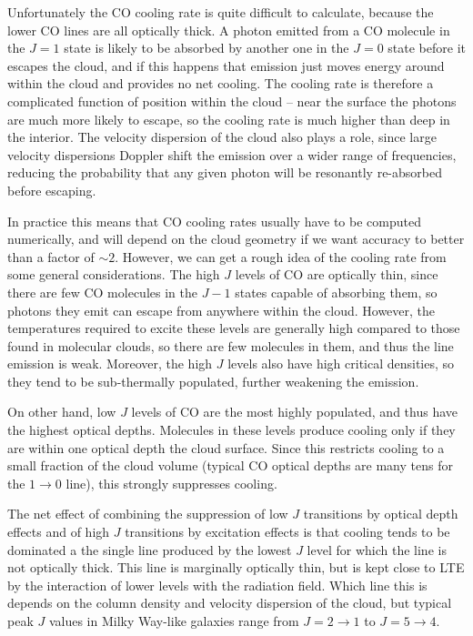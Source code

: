 Unfortunately the CO cooling rate is quite difficult to calculate, because the lower CO lines are all optically thick. A photon emitted from a CO molecule in the $J=1$ state is likely to be absorbed by another one in the $J=0$ state before it escapes the cloud, and if this happens that emission just moves energy around within the cloud and provides no net cooling. The cooling rate is therefore a complicated function of position within the cloud -- near the surface the photons are much more likely to escape, so the cooling rate is much higher than deep in the interior. The velocity dispersion of the cloud also plays a role, since large velocity dispersions Doppler shift the emission over a wider range of frequencies, reducing the probability that any given photon will be resonantly re-absorbed before escaping.

In practice this means that CO cooling rates usually have to be computed numerically, and will depend on the cloud geometry if we want accuracy to better than a factor of $\sim 2$. However, we can get a rough idea of the cooling rate from some general considerations. The high $J$ levels of CO are optically thin, since there are few CO molecules in the $J-1$ states capable of absorbing them, so photons they emit can escape from anywhere within the cloud.
However, the temperatures required to excite these levels are generally high compared to those found in molecular clouds, so there are few molecules in them, and thus the line emission is weak. Moreover, the high $J$ levels also have high critical densities, so they tend to be sub-thermally populated, further weakening the emission.

On other hand, low $J$ levels of CO are the most highly populated, and thus have the highest optical depths. Molecules in these levels produce cooling only if they are within one optical depth the cloud surface. Since this restricts cooling to a small fraction of the cloud volume (typical CO optical depths are many tens for the $1\rightarrow 0$ line), this strongly suppresses cooling.

The net effect of combining the suppression of low $J$ transitions by optical depth effects and of high $J$ transitions by excitation effects is that cooling tends to be dominated a the single line produced by the lowest $J$ level for which the line is not optically thick. This line is marginally optically thin, but is kept close to LTE by the interaction of lower levels with the radiation field. Which line this is depends on the column density and velocity dispersion of the cloud, but typical peak $J$ values in Milky Way-like galaxies range from $J=2\rightarrow 1$ to $J=5\rightarrow 4$.

